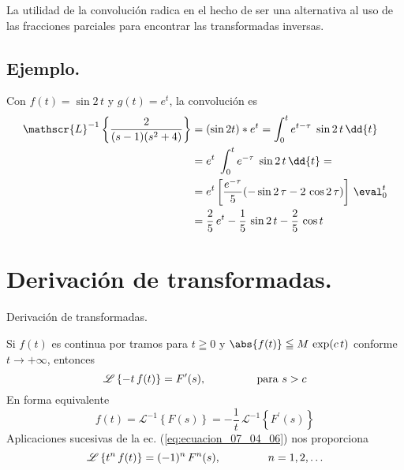  La utilidad de la convolución radica en el hecho de ser una alternativa al uso de las fracciones parciales para encontrar las transformadas inversas.
\subsection*{Ejemplo.}
Con $f(t) = \sin 2 \, t$ y $g(t) = e^{t}$, la convolución es
\begin{align*}
\mathscr{L}^{-1} \left\{ \dfrac{2}{(s-1)(s^{2} + 4)} \right\} &= (\sin 2t) * e^{t} = \int_{0}^{t} e^{t - \tau} \; \sin 2 \, t \, \dd{t} \\
&= e^{t} \; \int_{0}^{t} e^{-\tau} \; \sin 2 \, t \, \dd{t} = \\
&= e^{t} \left[ \dfrac{e^{-\tau}}{5} (- \sin 2 \, \tau - 2 \, \cos 2 \, \tau) \right] \, \eval_{0}^{t} \\
&= \dfrac{2}{5} \, e^{t} - \dfrac{1}{5} \, \sin 2 \, t - \dfrac{2}{5} \, \cos t
\end{align*}
\section{Derivación de transformadas.}
\begin{teo}{Derivación de transformadas.}

Si $f(t)$ es continua por tramos para $t \geqq 0$ y $\abs{f(t)} \leqq M \, \exp(c \, t)$ conforme $t \to +\infty$, entonces
\begin{equation}
\mathscr{L} \left\{ -t \, f(t) \right\} = F^{\prime}(s), \hspace{1.5cm} \mbox{ para } s > c
\label{eq:ecuacion_07_04_06}
\end{equation}
En forma equivalente
\begin{equation}
f(t) = \mathscr{L}^{-1} \left\{ F(s) \right\} = - \dfrac{1}{t} \, \mathscr{L}^{-1} \left\{ F^{\prime}(s) \right\}
\label{eq:ecuacion_07_04_07}
\end{equation}
Aplicaciones sucesivas de la ec. (\ref{eq:ecuacion_07_04_06}) nos proporciona
\begin{equation}
\mathscr{L} \left\{ t^{n} \, f(t) \right\} = (-1)^{n} \, F^{n}(s), \hspace{1.5cm} n = 1, 2, \ldots
\label{eq:ecuacion_07_04_08}
\end{equation}
\end{teo}

